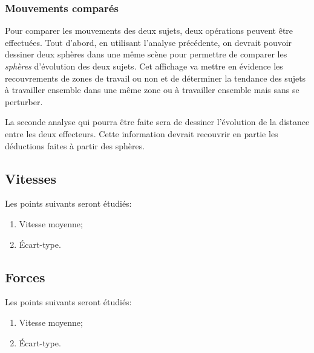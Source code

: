 \documentclass[a4paper,fleqn]{report}
\begin{document}
				\subsubsection{Mouvements comparés}
					Pour comparer les mouvements des deux sujets, deux opérations peuvent être effectuées.
					Tout d'abord, en utilisant l'analyse précédente, on devrait pouvoir dessiner deux sphères dans une même scène  pour permettre de comparer les \emph{sphères} d'évolution des deux sujets.
					Cet affichage va mettre en évidence les recouvrements de zones de travail ou non et de déterminer la tendance des sujets à travailler ensemble dans une même zone ou à travailler ensemble mais sans se perturber.

					La seconde analyse qui pourra être faite sera de dessiner l'évolution de la distance entre les deux effecteurs.
					Cette information devrait recouvrir en partie les déductions faites à partir des sphères.

			\subsection{Vitesses}
				Les points suivants seront étudiés:
				\begin{enumerate}
					\item Vitesse moyenne;
					\item Écart-type.
				\end{enumerate}

			\subsection{Forces}
				Les points suivants seront étudiés:
				\begin{enumerate}
					\item Vitesse moyenne;
					\item Écart-type.
				\end{enumerate}
\end{document}
